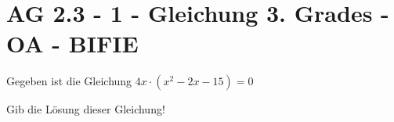 \section{AG 2.3 - 1 - Gleichung 3. Grades - OA - BIFIE}

\begin{beispiel}[AG 2.3]{1} %
Gegeben ist die Gleichung $4x\cdot (x^2-2x-15)=0$

Gib die Lösung dieser Gleichung!

\end{beispiel}